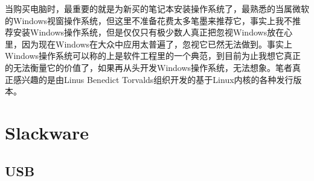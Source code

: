 \documentclass[paper=a4,fontsize=11pt]{article}
\begin{document}
	\clearpage
	
	当购买电脑时，最重要的就是为新买的笔记本安装操作系统了，最熟悉的当属微软的Windows视窗操作系统，但这里不准备花费太多笔墨来推荐它，事实上我不推荐安装Windows操作系统，但是仅仅只有极少数人真正把忽视Windows放在心里，因为现在Windows在大众中应用太普遍了，忽视它已然无法做到。事实上Windows操作系统可以称的上是软件工程里的一个典范，到目前为止我想它真正的无法衡量它的价值了，如果再从头开发Windows操作系统，无法想象。笔者真正感兴趣的是由Linus Benedict Torvalds组织开发的基于Linux内核的各种发行版本。
	
	\newpage
	
	\section{Slackware}
	
	\subsection{USB}
	
\end{document}
